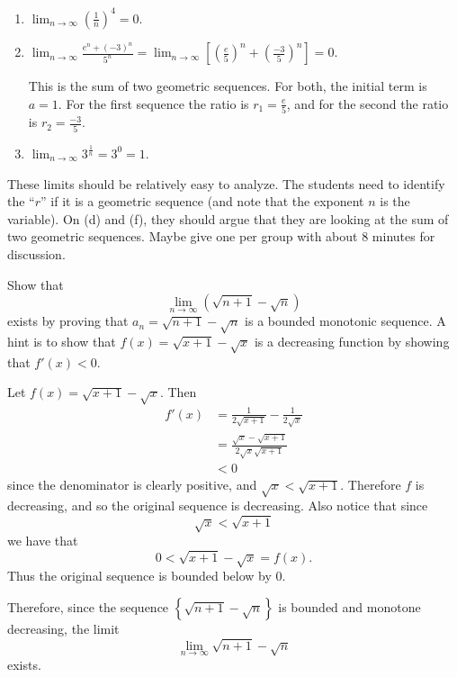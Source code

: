 \documentclass[handout]{ximera}
\begin{document}
\begin{problem}
\begin{freeResponse}
\begin{enumerate}
	\item  $\lim_{n \to \infty} \left( \frac{1}{n} \right)^4 = 0$.  
	
	\item  $\lim_{n \to \infty} \frac{e^n + (-3)^n}{5^n} = \lim_{n \to \infty} \left[ \left( \frac{e}{5} \right)^n + \left( \frac{-3}{5} \right)^n \right] = 0.$  
	
	This is the sum of two geometric sequences.  
	For both, the initial term is $a = 1$.  
	For the first sequence the ratio is $r_1 = \frac{e}{5}$, and for the second the ratio is $r_2 = \frac{-3}{5}$.
	
	\item  $\lim_{n \to \infty} 3^\frac{1}{n} = 3^0 = 1$.  
	
	\end{enumerate}
	\end{freeResponse}

\end{problem}

\begin{instructorNotes}
These limits should be relatively easy to analyze.  
The students need to identify the ``$r$'' if it is a geometric sequence (and note that the exponent $n$ is the variable).  
On (d) and (f), they should argue that they are looking at the sum of two geometric sequences.  
Maybe give one per group with about $8$ minutes for discussion.  
\end{instructorNotes}







\begin{problem}
Show that 
$$\lim_{n \to \infty} \left( \sqrt{n+1} - \sqrt{n} \right)$$ 
exists by proving that $a_n = \sqrt{n+1} - \sqrt{n}$ is a bounded monotonic sequence.  A hint is to show that $f(x) = \sqrt{x+1} - \sqrt{x}$ is a decreasing function by showing that $f'(x) < 0$.  
	\begin{freeResponse}
	Let $f(x) = \sqrt{x+1} - \sqrt{x}$.  Then
		\begin{align*}
		f'(x) 
		&= \frac{1}{2 \sqrt{x+1}} - \frac{1}{2 \sqrt{x}}  \\
		&= \frac{\sqrt{x} - \sqrt{x+1}}{2 \sqrt{x}\sqrt{x+1}}  \\
		&< 0
		\end{align*}
	since the denominator is clearly positive, and $\sqrt{x} < \sqrt{x+1}$.
	Therefore $f$ is decreasing, and so the original sequence is decreasing.  
	Also notice that since 
	$$\sqrt{x} < \sqrt{x+1}$$
	we have that 
	$$0 < \sqrt{x+1} - \sqrt{x} = f(x).$$
	Thus the original sequence is bounded below by $0$.  \

	Therefore, since the sequence $\left\{ \sqrt{n+1} - \sqrt{n} \right\}$ is bounded and monotone decreasing, the limit
		\[
		\lim_{n \to \infty} \sqrt{n+1} - \sqrt{n}
		\]
	exists.
	\end{freeResponse}
		
\end{problem}
\end{document}
